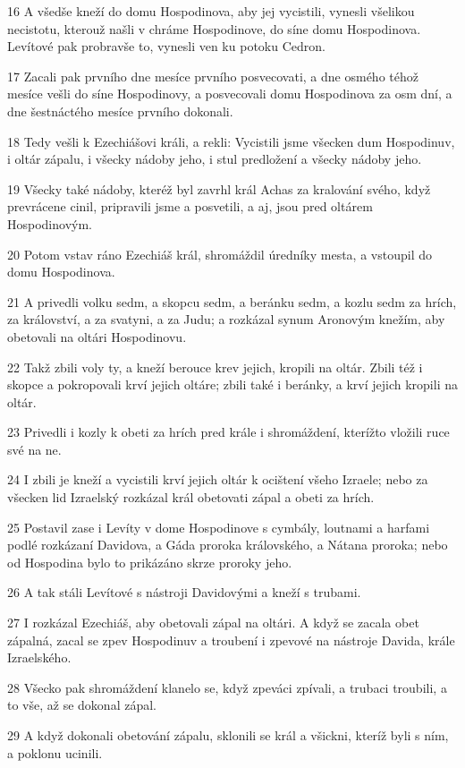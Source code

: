 \par 16 A všedše kneží do domu Hospodinova, aby jej vycistili, vynesli všelikou necistotu, kterouž našli v chráme Hospodinove, do síne domu Hospodinova. Levítové pak probravše to, vynesli ven ku potoku Cedron.
\par 17 Zacali pak prvního dne mesíce prvního posvecovati, a dne osmého téhož mesíce vešli do síne Hospodinovy, a posvecovali domu Hospodinova za osm dní, a dne šestnáctého mesíce prvního dokonali.
\par 18 Tedy vešli k Ezechiášovi králi, a rekli: Vycistili jsme všecken dum Hospodinuv, i oltár zápalu, i všecky nádoby jeho, i stul predložení a všecky nádoby jeho.
\par 19 Všecky také nádoby, kteréž byl zavrhl král Achas za kralování svého, když prevrácene cinil, pripravili jsme a posvetili, a aj, jsou pred oltárem Hospodinovým.
\par 20 Potom vstav ráno Ezechiáš král, shromáždil úredníky mesta, a vstoupil do domu Hospodinova.
\par 21 A privedli volku sedm, a skopcu sedm, a beránku sedm, a kozlu sedm za hrích, za království, a za svatyni, a za Judu; a rozkázal synum Aronovým knežím, aby obetovali na oltári Hospodinovu.
\par 22 Takž zbili voly ty, a kneží berouce krev jejich, kropili na oltár. Zbili též i skopce a pokropovali krví jejich oltáre; zbili také i beránky, a krví jejich kropili na oltár.
\par 23 Privedli i kozly k obeti za hrích pred krále i shromáždení, kterížto vložili ruce své na ne.
\par 24 I zbili je kneží a vycistili krví jejich oltár k ocištení všeho Izraele; nebo za všecken lid Izraelský rozkázal král obetovati zápal a obeti za hrích.
\par 25 Postavil zase i Levíty v dome Hospodinove s cymbály, loutnami a harfami podlé rozkázaní Davidova, a Gáda proroka královského, a Nátana proroka; nebo od Hospodina bylo to prikázáno skrze proroky jeho.
\par 26 A tak stáli Levítové s nástroji Davidovými a kneží s trubami.
\par 27 I rozkázal Ezechiáš, aby obetovali zápal na oltári. A když se zacala obet zápalná, zacal se zpev Hospodinuv a troubení i zpevové na nástroje Davida, krále Izraelského.
\par 28 Všecko pak shromáždení klanelo se, když zpeváci zpívali, a trubaci troubili, a to vše, až se dokonal zápal.
\par 29 A když dokonali obetování zápalu, sklonili se král a všickni, kteríž byli s ním, a poklonu ucinili.
